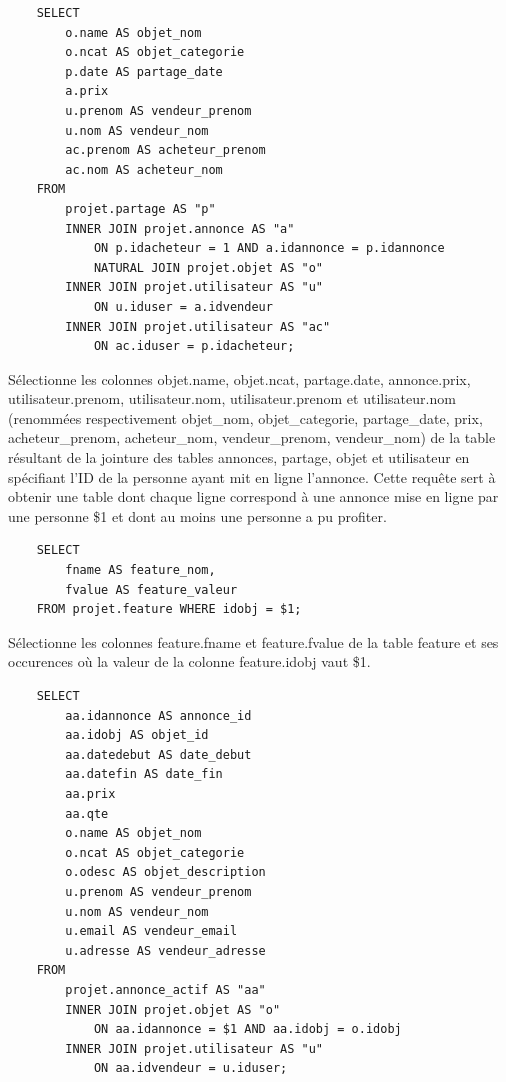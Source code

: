 \documentclass[a4paper,12pt]{article}
\begin{document}
\begin{spacing}{1}
    \begin{verbatim}
    SELECT
        o.name AS objet_nom
        o.ncat AS objet_categorie
        p.date AS partage_date
        a.prix
        u.prenom AS vendeur_prenom
        u.nom AS vendeur_nom
        ac.prenom AS acheteur_prenom
        ac.nom AS acheteur_nom
    FROM
        projet.partage AS "p"
        INNER JOIN projet.annonce AS "a"
            ON p.idacheteur = 1 AND a.idannonce = p.idannonce
            NATURAL JOIN projet.objet AS "o"
        INNER JOIN projet.utilisateur AS "u"
            ON u.iduser = a.idvendeur 
        INNER JOIN projet.utilisateur AS "ac"
            ON ac.iduser = p.idacheteur;
	\end{verbatim}
Sélectionne les colonnes objet.name, objet.ncat, partage.date, annonce.prix, utilisateur.prenom, utilisateur.nom, utilisateur.prenom et utilisateur.nom (renommées respectivement objet\_nom, objet\_categorie, partage\_date, prix, acheteur\_prenom, acheteur\_nom, vendeur\_prenom, vendeur\_nom) de la table résultant de la jointure des tables annonces, partage, objet et utilisateur en spécifiant l'ID de la personne ayant mit en ligne l'annonce.
Cette requête sert à obtenir une table dont chaque ligne correspond à une annonce mise en ligne par une personne \$1 et dont au moins une personne a pu profiter.

    \begin{verbatim}
    SELECT
	    fname AS feature_nom,
	    fvalue AS feature_valeur
    FROM projet.feature WHERE idobj = $1;
    \end{verbatim}
Sélectionne les colonnes feature.fname et feature.fvalue de la table feature et ses occurences où la valeur de la colonne feature.idobj vaut \$1.

    \begin{verbatim}
    SELECT
        aa.idannonce AS annonce_id
        aa.idobj AS objet_id
        aa.datedebut AS date_debut
        aa.datefin AS date_fin
        aa.prix
        aa.qte
        o.name AS objet_nom
        o.ncat AS objet_categorie
        o.odesc AS objet_description 
        u.prenom AS vendeur_prenom
        u.nom AS vendeur_nom
        u.email AS vendeur_email
        u.adresse AS vendeur_adresse
    FROM
        projet.annonce_actif AS "aa"
        INNER JOIN projet.objet AS "o"
            ON aa.idannonce = $1 AND aa.idobj = o.idobj
        INNER JOIN projet.utilisateur AS "u"
            ON aa.idvendeur = u.iduser;
	

\end{verbatim}
\end{spacing}
\end{document}
